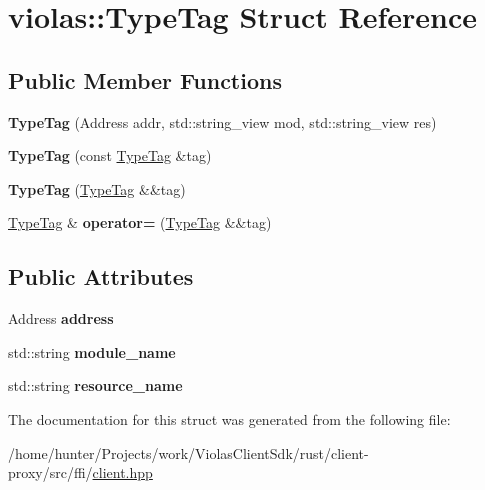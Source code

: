 \hypertarget{structviolas_1_1_type_tag}{}\section{violas\+:\+:Type\+Tag Struct Reference}
\label{structviolas_1_1_type_tag}
\subsection*{Public Member Functions}
\begin{DoxyCompactItemize}
\item 
\mbox{\label{structviolas_1_1_type_tag_ad0b02cd93f45bceaf8316657f7576e04}} 
{\bfseries Type\+Tag} (Address addr, std\+::string\+\_\+view mod, std\+::string\+\_\+view res)
\item 
\mbox{\label{structviolas_1_1_type_tag_a24d765f5fdad075cf6e1b4e1d72b7509}} 
{\bfseries Type\+Tag} (const \hyperlink{structviolas_1_1_type_tag}{Type\+Tag} \&tag)
\item 
\mbox{\label{structviolas_1_1_type_tag_acd039f4d463a0bf2b7627ceac0f8fb8e}} 
{\bfseries Type\+Tag} (\hyperlink{structviolas_1_1_type_tag}{Type\+Tag} \&\&tag)
\item 
\mbox{\label{structviolas_1_1_type_tag_a6fad44c67023475d91031d6ea7c96a50}} 
\hyperlink{structviolas_1_1_type_tag}{Type\+Tag} \& {\bfseries operator=} (\hyperlink{structviolas_1_1_type_tag}{Type\+Tag} \&\&tag)
\end{DoxyCompactItemize}
\subsection*{Public Attributes}
\begin{DoxyCompactItemize}
\item 
\mbox{\label{structviolas_1_1_type_tag_acc653128cb55dca87509c003416d49c4}} 
Address {\bfseries address}
\item 
\mbox{\label{structviolas_1_1_type_tag_a460ac5aba207c2c0285ed567b26788cd}} 
std\+::string {\bfseries module\+\_\+name}
\item 
\mbox{\label{structviolas_1_1_type_tag_a39c0e6e421373e2eb8e4180064cb510b}} 
std\+::string {\bfseries resource\+\_\+name}
\end{DoxyCompactItemize}


The documentation for this struct was generated from the following file\+:\begin{DoxyCompactItemize}
\item 
/home/hunter/\+Projects/work/\+Violas\+Client\+Sdk/rust/client-\/proxy/src/ffi/\hyperlink{client_8hpp}{client.\+hpp}\end{DoxyCompactItemize}

